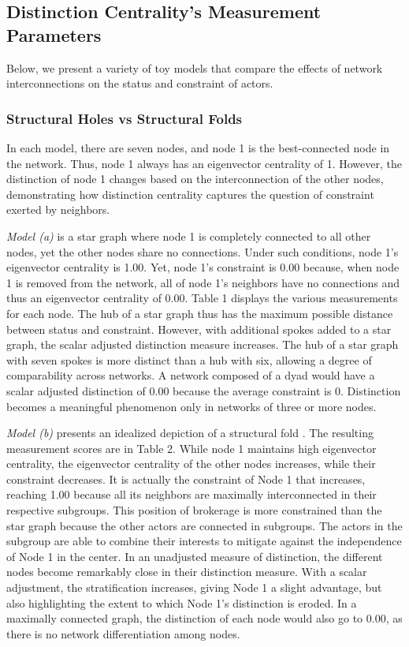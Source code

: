 \documentclass[12pt]{article}
\begin{document}
\subsection{Distinction Centrality's Measurement Parameters}
Below, we present a variety of toy models that compare the effects of network interconnections on the status and constraint of actors.

\subsubsection{Structural Holes vs Structural Folds}
 In each model, there are seven nodes, and node 1 is the best-connected node in the network. Thus, node 1 always has an eigenvector centrality of 1. However, the distinction of node 1 changes based on the interconnection of the other nodes, demonstrating how distinction centrality captures the question of constraint exerted by neighbors. 

\textit{Model (a)} is a star graph where node 1 is completely connected to all other nodes, yet the other nodes share no connections. Under such conditions, node 1's eigenvector centrality is 1.00. Yet, node 1's constraint is 0.00 because, when node 1 is removed from the network, all of node 1's neighbors have no connections and thus an eigenvector centrality of 0.00. Table 1 displays the various measurements for each node. The hub of a star graph thus has the maximum possible distance between status and constraint. However, with additional spokes added to a star graph, the scalar adjusted distinction measure increases. The hub of a star graph with seven spokes is more distinct than a hub with six, allowing a degree of comparability across networks. A network composed of a dyad would have a scalar adjusted distinction of 0.00 because the average constraint is 0. Distinction becomes a meaningful phenomenon only in networks of three or more nodes. 

\textit{Model (b)} presents an idealized depiction of a structural fold \citep{vedres2010structural}. The resulting measurement scores are in Table 2. While node 1 maintains high eigenvector centrality, the eigenvector centrality of the other nodes increases, while their constraint decreases. It is actually the constraint of Node 1 that increases, reaching 1.00 because all its neighbors are maximally interconnected in their respective subgroups. This position of brokerage is more constrained than the star graph because the other actors are connected in subgroups. The actors in the subgroup are able to combine their interests to mitigate against the independence of Node 1 in the center. In an unadjusted measure of distinction, the different nodes become remarkably close in their distinction measure. With a scalar adjustment, the stratification increases, giving Node 1 a slight advantage, but also highlighting the extent to which Node 1's distinction is eroded. In a maximally connected graph, the distinction of each node would also go to 0.00, as there is no network differentiation among nodes. 
\end{document}
